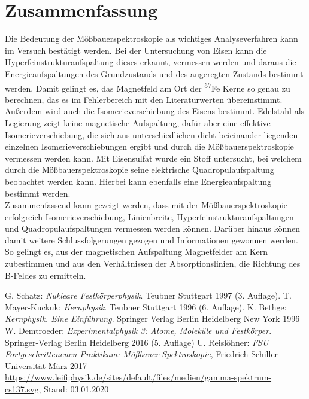 \documentclass[a4paper,twoside,final]{article}
\begin{document}
\section{Zusammenfassung}
Die Bedeutung der Mößbauerspektroskopie als wichtiges Analyseverfahren kann im Versuch bestätigt werden. Bei der Untersuchung von Eisen kann die Hyperfeinstrukturaufspaltung dieses erkannt, vermessen werden und daraus die Energieaufspaltungen des Grundzustands und des angeregten Zustands bestimmt werden. Damit gelingt es, das Magnetfeld am Ort der \textsuperscript{57}Fe Kerne so genau zu berechnen, das es im Fehlerbereich mit den Literaturwerten übereinstimmt.  Außerdem wird auch die Isomerieverschiebung des Eisens bestimmt. Edelstahl als Legierung zeigt keine magnetische Aufspaltung, dafür aber eine effektive Isomerieverschiebung, die sich aus unterschiedlichen dicht beieinander liegenden einzelnen Isomerieverschiebungen ergibt und durch die Mößbauerspektroskopie vermessen werden kann. Mit Eisensulfat wurde ein Stoff untersucht, bei welchem durch die Mößbauerspektroskopie seine elektrische Quadropulaufspaltung beobachtet werden kann. Hierbei kann ebenfalls eine Energieaufspaltung bestimmt werden. \\
Zusammenfassend kann gezeigt werden, dass mit der Mößbauerspektroskopie erfolgreich Isomerieverschiebung, Linienbreite, Hyperfeinstrukturaufspaltungen und Quadropulaufspaltungen vermessen werden können. Darüber hinaus können damit weitere Schlussfolgerungen gezogen und Informationen gewonnen werden. So gelingt es, aus der magnetischen Aufspaltung Magnetfelder am Kern zubestimmen und aus den Verhältnissen der Absorptionslinien, die Richtung des B-Feldes zu ermitteln.

\begin{thebibliography}{xxx}
	G. Schatz: \textit{Nukleare Festkörperphysik}. Teubner Stuttgart 1997 (3. Auflage).
	T. Mayer-Kuckuk: \textit{Kernphysik}. Teubner Stuttgart 1996 (6. Auflage).
  K. Bethge: \textit{Kernphysik. Eine Einführung}. Springer Verlag Berlin Heidelberg New York 1996
  W. Demtroeder: \textit{Experimentalphysik 3: Atome, Moleküle und Festkörper}. Springer-Verlag Berlin Heidelberg 2016 (5. Auflage)
  U. Reislöhner: \textit{FSU Fortgeschrittenenen Praktikum: Mößbauer Spektroskopie}, Fried\-rich-Schil\-ler-Uni\-versi\-tät März 2017
  \url{https://www.leifiphysik.de/sites/default/files/medien/gamma-spektrum-cs137.svg}, Stand: 03.01.2020
\end{thebibliography}
\end{document}
